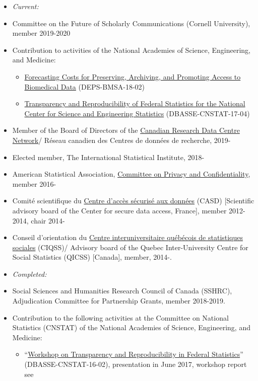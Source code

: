 \documentclass[10pt,letterpaper]{report}
\begin{document}
\begin{itemize}
\item[] \textit{Current:}
\item Committee on the Future of Scholarly Communications (Cornell University), member 2019-2020 
\item Contribution to activities of the National Academies of Science, Engineering, and Medicine:
\begin{itemize}
	\item \href{https://www8.nationalacademies.org/pa/projectview.aspx?key=51436}{Forecasting Costs for Preserving, Archiving, and Promoting Access to Biomedical Data} (DEPS-BMSA-18-02)
	\item \href{https://www8.nationalacademies.org/pa/projectview.aspx?key=51187}{Transparency and Reproducibility of Federal Statistics for the National Center for Science and Engineering Statistics} (DBASSE-CNSTAT-17-04)
\end{itemize} 
\item Member of the Board of Directors of the \href{https://crdcn.org/}{Canadian Research Data Centre Network}/ R\'eseau canadien des Centres de donn\'ees de recherche, 2019- 
\item Elected member, The International Statistical Institute, 2018-
\item American Statistical Association, \href{http://community.amstat.org/cpc/home}{Committee on Privacy and Confidentiality}, member 2016- 
\item Comit\'e scientifique du \href{https://casd.eu/}{Centre d'acc\`es s\'ecuris\'e aux 
donn\'ees} (CASD) [Scientific advisory board of the Center for secure data 
access, France], member 2012-2014, chair 2014-  
\item Conseil d'orientation du \href{https://ciqss.org}{Centre interuniversitaire 	qu\'eb\'ecois de statistiques sociales} (CIQSS)/ Advisory board of the Quebec Inter-University 
Centre for Social Statistics (QICSS) [Canada], member, 2014-.
\item[] \textit{Completed:}
\item Social Sciences and Humanities Research Council of Canada (SSHRC), Adjudication Committee for Partnership Grants, member 2018-2019.
\item Contribution to the following activities at the Committee on National Statistics (CNSTAT) of the National Academies of Science, Engineering, and Medicine:
\begin{itemize}
	\item ``\href{https://www8.nationalacademies.org/pa/projectview.aspx?key=49809}{Workshop on Transparency and Reproducibility in Federal Statistics}'' (DBASSE-CNSTAT-16-02), presentation in June 2017, workshop report see \cite{NAP25305}

\end{itemize}
\end{itemize}
\end{document}
